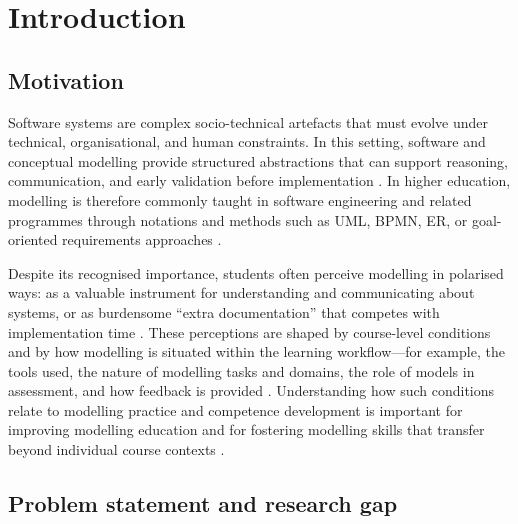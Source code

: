 
%

\chapter{Introduction}
\label{cha:introduction}

\section{Motivation}
\label{sec:intro_motivation}

Software systems are complex socio-technical artefacts that must evolve under technical, organisational, and human constraints. In this setting, software and conceptual modelling provide structured abstractions that can support reasoning, communication, and early validation before implementation \cite{buchmann2019conceptual}. In higher education, modelling is therefore commonly taught in software engineering and related programmes through notations and methods such as UML, BPMN, ER, or goal-oriented requirements approaches \cite{istar-learning,bpmn-education,maslov2025conceptual}.

Despite its recognised importance, students often perceive modelling in polarised ways: as a valuable instrument for understanding and communicating about systems, or as burdensome ``extra documentation'' that competes with implementation time \cite{chakraborty2022perceptions,grassl2026dei,liebel2017model}. These perceptions are shaped by course-level conditions and by how modelling is situated within the learning workflow---for example, the tools used, the nature of modelling tasks and domains, the role of models in assessment, and how feedback is provided \cite{grassl2026dei,liebel2017model}. Understanding how such conditions relate to modelling practice and competence development is important for improving modelling education and for fostering modelling skills that transfer beyond individual course contexts \cite{maslov2025conceptual}.


\section{Problem statement and research gap}
\label{sec:intro_gap}

